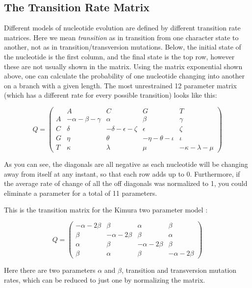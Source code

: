 \documentclass[11pt]{article}
\begin{document}
\subsection{The Transition Rate Matrix}

Different models of nucleotide evolution are defined by different transition rate matrices. 
Here we mean \textit{transition} as in transition from one character state to another, not as in transition/transversion mutations.  
Below, the initial state of the nucleotide is the first column, and the final state is the top row, however these are not usually shown in the matrix.
Using the matrix exponential shown above, one can calculate the probability of one nucleotide changing into another on a branch with a given length.  
The most unrestrained 12 parameter matrix (which has a different rate for every possible transition) looks like this:


\[ Q = \left( \begin{array}{ccccc}
  & A & C & G & T \\
A &  - \alpha - \beta - \gamma  &  \alpha  &  \beta  &  \gamma  \\ 
C &  \delta  &  - \delta - \epsilon - \zeta  &  \epsilon  &  \zeta  \\ 
G &  \eta  &  \theta  &  - \eta - \theta - \iota  &  \iota  \\ 
T &  \kappa  &  \lambda  &  \mu  &  - \kappa - \lambda - \mu  
\end{array} \right)\]


As you can see, the diagonals are all negative as each nucleotide will be changing away from itself at any instant, so that each row adds up to 0.  
Furthermore, if the average rate of change of all the off diagonals was normalized to 1, you could eliminate a parameter for a total of 11 parameters.

This is the transition matrix for the Kimura two parameter model \citep{kimura1980simple}:

\[ Q = \left( \begin{array}{cccc}
- \alpha - 2 \beta  &  \beta  &  \alpha  &  \beta  \\ 
\beta  &  - \alpha - 2 \beta  &  \beta  &  \alpha  \\ 
\alpha  &  \beta  &  - \alpha - 2 \beta  &  \beta  \\ 
\beta  &  \alpha  &  \beta  &  - \alpha - 2 \beta   
\end{array} \right)\]


Here there are two parameters $\alpha$ and $\beta$, transition and transversion mutation rates, which can be reduced to just one by normalizing the matrix.
\end{document}
